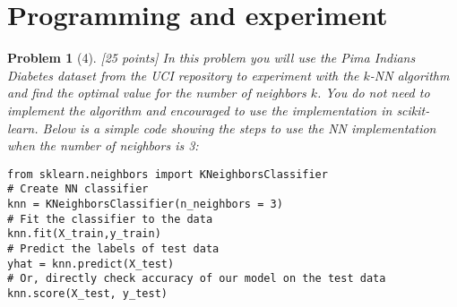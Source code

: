 \documentclass[11pt]{article}
\theoremstyle{quest}
\newtheorem*{problem}{Problem}
\begin{document}
\section*{Programming and experiment}
\begin{problem}[4]
[25 points] In this problem you will use the Pima Indians Diabetes dataset from the UCI repository to experiment with the $k$-NN algorithm and find the optimal value for the number of neighbors $k$.
You do not need to implement the algorithm and encouraged to use the implementation in \textsf{scikit-learn}.
Below is a simple code showing the steps to use the NN implementation when the number of neighbors is 3:

\begin{verbatim}
from sklearn.neighbors import KNeighborsClassifier
# Create NN classifier
knn = KNeighborsClassifier(n_neighbors = 3)
# Fit the classifier to the data
knn.fit(X_train,y_train)
# Predict the labels of test data
yhat = knn.predict(X_test)
# Or, directly check accuracy of our model on the test data
knn.score(X_test, y_test)
\end{verbatim}


\end{problem}
\end{document}
